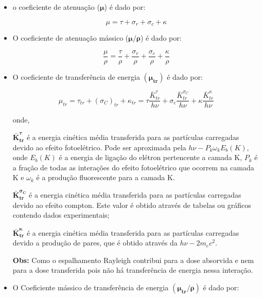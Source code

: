 \documentclass[11pt,a4paper]{article}
\begin{document}
	\begin{itemize}
		\item o coeficiente de atenuação ($\mathbf{\mu}$) é dado por:

			\begin{equation}
				\mu = \tau + \sigma_r + \sigma_c + \kappa
			\end{equation}

		\item O coeficiente de atenuação mássico ($\mathbf{\mu/\rho}$) é dado por:
		
			\begin{equation}
				\frac{\mu}{\rho} = \frac{\tau}{\rho} + \frac{\sigma_r}{\rho} + \frac{\sigma_c}{\rho} + \frac{\kappa}{\rho}
			\end{equation}

		\item O coeficiente de transferência de energia $(\mathbf{\mu_{tr}})$ é dado por:
		
			\begin{equation}
				\mu_{tr} = \tau_{tr} + (\sigma_C)_{tr} + \kappa_{tr}
				= \tau \frac{\bar{K}_{tr}^{\tau}}{h\nu} + \sigma_c \frac{\bar{K}_{tr}^{\sigma_C}}{h\nu} + \kappa \frac{\bar{K}_{tr}^{\kappa}}{h\nu}
			\end{equation}

		\noindent onde,


		\noindent $\mathbf{\bar{K}_{tr}^{\tau}}$ é a energia cinética média transferida para as partículas carregadas devido ao efeito fotoelétrico. Pode ser aproximada pela  $h\nu - P_k \omega_k E_b(K)$, onde $E_b(K)$ é a energia de ligação do elétron pertencente a camada K, $P_k$ é a fração de todas as interações do efeito fotoelétrico que ocorrem na camada K e $\omega_k$ é a produção fluorescente para a camada K.
		

		\noindent $\mathbf{\bar{K}_{tr}^{\sigma_C}}$ é a energia cinética média transferida para as partículas carregadas devido ao efeito compton. Este valor é obtido através de tabelas ou gráficos contendo dados experimentais; 


		\noindent $\mathbf{\bar{K}_{tr}^{\kappa}}$ é a energia cinética média transferida para as partículas carregadas devido a produção de pares, que é obtido através da  $h\nu - 2m_ec^2$.


		\textbf{Obs:} Como o espalhamento Rayleigh  contribui para a dose absorvida e nem para a dose transferida pois não há transferência de energia nessa interação.

	\item O Coeficiente mássico de transferência de energia $(\mathbf{\mu_{tr}/\rho})$ é dado por:
	

\end{itemize}
\end{document}
